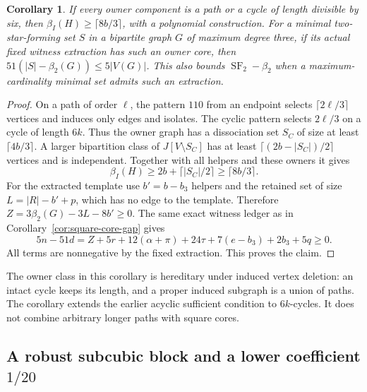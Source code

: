 \documentclass[11pt]{article}
\newtheorem{corollary}[theorem]{Corollary}
\newcommand{\SF}{\operatorname{SF}_2}
\newcommand{\diss}{\beta_2}
\begin{document}
\begin{corollary}\label{cor:path-six-core}
If every owner component is a path or a cycle of length divisible by six,
then $\beta_I(H)\ge\lceil8b/3\rceil$, with a polynomial construction.
For a minimal two-star-forming set $S$ in a bipartite graph $G$ of maximum
degree three, if its actual fixed witness extraction has such an owner core,
then $51(|S|-\diss(G))\le5|V(G)|$. This also bounds $\SF-\diss$ when a
maximum-cardinality minimal set admits such an extraction.
\end{corollary}
\begin{proof}
On a path of order $\ell$, the pattern $110$ from an endpoint selects
$\lceil2\ell/3\rceil$ vertices and induces only edges and isolates.
The cyclic pattern selects $2\ell/3$ on a cycle of length $6k$.
Thus the owner graph has a dissociation set $S_C$ of size at least
$\lceil4b/3\rceil$. A larger bipartition class of $J[V\setminus S_C]$
has at least $\lceil(2b-|S_C|)/2\rceil$ vertices and is independent.
Together with all helpers and these owners it gives
\[
 \beta_I(H)\ge2b+\lceil|S_C|/2\rceil\ge\lceil8b/3\rceil.
\]
For the extracted template use $b'=b-b_3$ helpers and the retained set of size
$L=|R|-b'+p$, which has no edge to the template. Therefore
$Z=3\diss(G)-3L-8b'\ge0$. The same exact witness ledger as in
Corollary~\ref{cor:square-core-gap} gives
\[
 5n-51d=Z+5r+12(\alpha+\pi)+24\tau+7(e-b_3)+2b_3+5q\ge0.
\]
All terms are nonnegative by the fixed extraction. This proves the claim.
\end{proof}
The owner class in this corollary is hereditary under induced vertex deletion:
an intact cycle keeps its length, and a proper induced subgraph is a union of
paths. The corollary extends the earlier acyclic sufficient condition to
$6k$-cycles. It does not combine arbitrary longer paths with square cores.











\subsection{A robust subcubic block and a lower coefficient $1/20$}
\end{document}
